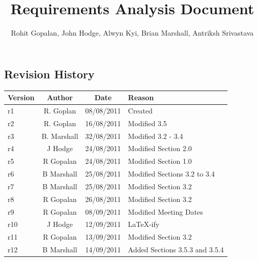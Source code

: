 
\title{Requirements Analysis Document}
\author{Rohit Gopalan, John Hodge, Alwyn Kyi, Brian Marshall, Antriksh Srivastava}

\pagestyle{fancy}
\renewcommand{\headheight}{15pt}
\fancyhead{} \fancyfoot{}
\fancyfoot[R]{\thepage \slash \pageref{LastPage}}	%
\renewcommand{\headrulewidth}{0.4pt} \renewcommand{\footrulewidth}{0.4pt}
\renewcommand{\headsep}{24pt}



\maketitle

\subsection*{Revision History}
\begin{tabularx}{\textwidth}{l c c X}
 \hline
 Version & Author & Date & Reason \\
 \hline \hline
 r1 & R. Goplan & 08/08/2011 & Created \\ \hline
 r2 & R. Goplan & 16/08/2011 & Modified 3.5 \\ \hline
 r3 & B. Marshall & 32/08/2011 & Modified 3.2 - 3.4 \\ \hline
 r4 & J Hodge & 24/08/2011 & Modified Section 2.0 \\ \hline
 r5 & R Gopalan & 24/08/2011 & Modified Section 1.0 \\ \hline
 r6 & B Marshall & 25/08/2011 & Modified Sections 3.2 to 3.4 \\ \hline
 r7 & B Marshall & 25/08/2011 & Modified Section 3.2 \\ \hline
 r8 & R Gopalan & 26/08/2011 & Modified Section 3.2 \\ \hline
 r9 & R Gopalan & 08/09/2011 & Modified Meeting Dates \\ \hline
 r10 & J Hodge & 12/09/2011 & LaTeX-ify \\ \hline
 r11 & R Gopalan & 13/09/2011 & Modified Section 3.2 \\ \hline
 r12 & B Marshall & 14/09/2011 & Added Sections 3.5.3 and 3.5.4 \\ \hline
\end{tabularx}

